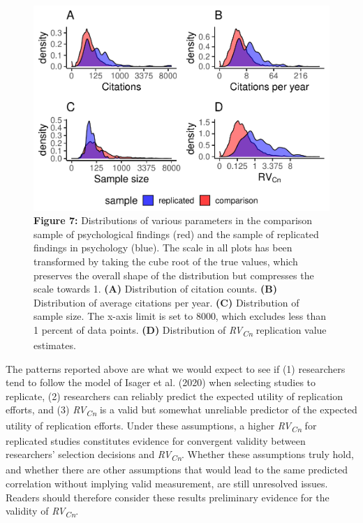 \documentclass[
  english,
  man,floatsintext]{apa6}
\begin{document}
\begin{figure}
\centering
\includegraphics{RVcn_manuscript_files/figure-latex/7-1.pdf}
\caption{\label{fig:7}\textbf{Figure 7:} Distributions of various parameters in the comparison sample of psychological findings (red) and the sample of replicated findings in psychology (blue). The scale in all plots has been transformed by taking the cube root of the true values, which preserves the overall shape of the distribution but compresses the scale towards 1. \textbf{(A)} Distribution of citation counts. \textbf{(B)} Distribution of average citations per year. \textbf{(C)} Distribution of sample size. The x-axis limit is set to 8000, which excludes less than 1 percent of data points. \textbf{(D)} Distribution of \textit{RV\textsubscript{Cn}} replication value estimates.}
\end{figure}

The patterns reported above are what we would expect to see if (1) researchers tend to follow the model of Isager et al. (2020) when selecting studies to replicate, (2) researchers can reliably predict the expected utility of replication efforts, and (3) \emph{RV\textsubscript{Cn}} is a valid but somewhat unreliable predictor of the expected utility of replication efforts. Under these assumptions, a higher \emph{RV\textsubscript{Cn}} for replicated studies constitutes evidence for convergent validity between researchers' selection decisions and \emph{RV\textsubscript{Cn}}. Whether these assumptions truly hold, and whether there are other assumptions that would lead to the same predicted correlation without implying valid measurement, are still unresolved issues. Readers should therefore consider these results preliminary evidence for the validity of \emph{RV\textsubscript{Cn}}.
\end{document}
